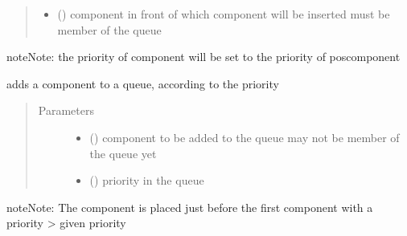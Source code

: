 \documentclass[letterpaper,10pt,english]{sphinxmanual}
\begin{document}
\begin{fulllineitems}
\begin{fulllineitems}
\begin{quote}
\begin{description}
\begin{itemize}
\item {} 
 ({\hyperref[\detokenize{Reference:salabim.Component}]{}}) \textendash{} component in front of which component will be inserted 
must be member of the queue

\end{itemize}

\end{description}\end{quote}

\begin{sphinxadmonition}{note}{Note:}
the priority of component will be set to the priority of poscomponent
\end{sphinxadmonition}

\end{fulllineitems}


\begin{fulllineitems}
\label{\detokenize{Reference:salabim.Queue.add_sorted}}
adds a component to a queue, according to the priority
\begin{quote}\begin{description}
\item[{Parameters}] \leavevmode\begin{itemize}
\item {} 
 ({\hyperref[\detokenize{Reference:salabim.Component}]{}}) \textendash{} component to be added to the queue 
may not be member of the queue yet

\item {} 
 () \textendash{} priority in the queue

\end{itemize}

\end{description}\end{quote}

\begin{sphinxadmonition}{note}{Note:}
The component is placed just before the first component with a priority \textgreater{} given priority
\end{sphinxadmonition}


\end{fulllineitems}
\end{fulllineitems}
\end{document}
